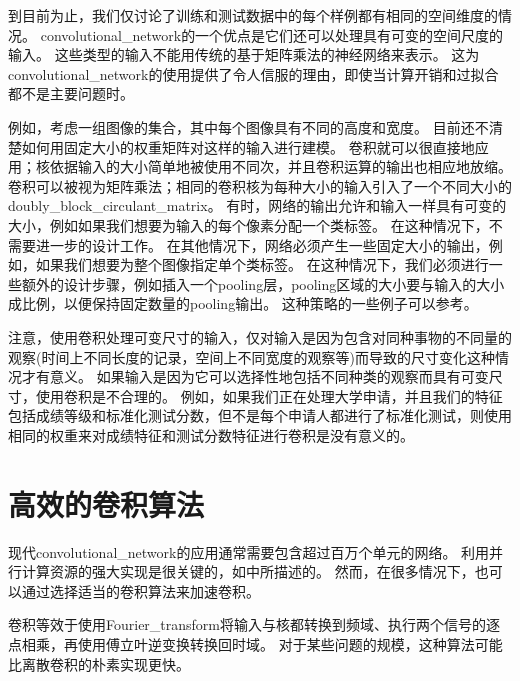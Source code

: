 到目前为止，我们仅讨论了训练和测试数据中的每个样例都有相同的空间维度的情况。
\gls{convolutional_network}的一个优点是它们还可以处理具有可变的空间尺度的输入。
这些类型的输入不能用传统的基于矩阵乘法的神经网络来表示。
这为\gls{convolutional_network}的使用提供了令人信服的理由，即使当计算开销和过拟合都不是主要问题时。

例如，考虑一组图像的集合，其中每个图像具有不同的高度和宽度。
目前还不清楚如何用固定大小的权重矩阵对这样的输入进行建模。
卷积就可以很直接地应用；核依据输入的大小简单地被使用不同次，并且卷积运算的输出也相应地放缩。
卷积可以被视为矩阵乘法；相同的卷积核为每种大小的输入引入了一个不同大小的\gls{doubly_block_circulant_matrix}。
有时，网络的输出允许和输入一样具有可变的大小，例如如果我们想要为输入的每个像素分配一个类标签。
在这种情况下，不需要进一步的设计工作。
在其他情况下，网络必须产生一些固定大小的输出，例如，如果我们想要为整个图像指定单个类标签。
在这种情况下，我们必须进行一些额外的设计步骤，例如插入一个\gls{pooling}层，\gls{pooling}区域的大小要与输入的大小成比例，以便保持固定数量的\gls{pooling}输出。
这种策略的一些例子可以参考。

注意，使用卷积处理可变尺寸的输入，仅对输入是因为包含对同种事物的不同量的观察(时间上不同长度的记录，空间上不同宽度的观察等)而导致的尺寸变化这种情况才有意义。
如果输入是因为它可以选择性地包括不同种类的观察而具有可变尺寸，使用卷积是不合理的。
例如，如果我们正在处理大学申请，并且我们的特征包括成绩等级和标准化测试分数，但不是每个申请人都进行了标准化测试，则使用相同的权重来对成绩特征和测试分数特征进行卷积是没有意义的。

\section{高效的卷积算法}
\label{sec:efficient_convolution_algorithms}

现代\gls{convolutional_network}的应用通常需要包含超过百万个单元的网络。
利用并行计算资源的强大实现是很关键的，如中所描述的。
然而，在很多情况下，也可以通过选择适当的卷积算法来加速卷积。
 
 
卷积等效于使用\gls{Fourier_transform}将输入与核都转换到频域、执行两个信号的逐点相乘，再使用傅立叶逆变换转换回时域。
对于某些问题的规模，这种算法可能比离散卷积的朴素实现更快。

